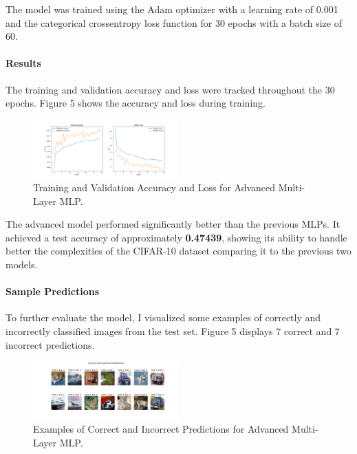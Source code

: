 \documentclass[lettersize,journal]{IEEEtran}
\begin{document}
The model was trained using the Adam optimizer with a learning rate of 0.001 and the categorical crossentropy loss function for 30 epochs with a batch size of 60.

\paragraph{\textbf{Results}}

The training and validation accuracy and loss were tracked throughout the 30 epochs. Figure 5 shows the accuracy and loss during training.

\begin{figure}[h!]
    \centering
    \includegraphics[width=0.5\textwidth]{training_history_MLP_BEST.png}
    \caption{Training and Validation Accuracy and Loss for Advanced Multi-Layer MLP.}
    \label{fig:mlp_best_training_history}
\end{figure}

The advanced model performed significantly better than the previous MLPs. It achieved a test accuracy of approximately \textbf{ 0.47439}, showing its ability to handle better the complexities of the CIFAR-10 dataset comparing it to the previous two models.

\paragraph{\textbf{Sample Predictions}}

To further evaluate the model, I visualized some examples of correctly and incorrectly classified images from the test set. Figure 5 displays 7 correct and 7 incorrect predictions.

\begin{figure}[h!]
    \centering
    \includegraphics[width=0.5\textwidth]{sample_predictions_MLP_BEST.png}
    \caption{Examples of Correct and Incorrect Predictions for Advanced Multi-Layer MLP.}
    \label{fig:mlp_best_predictions}
\end{figure}
\end{document}
